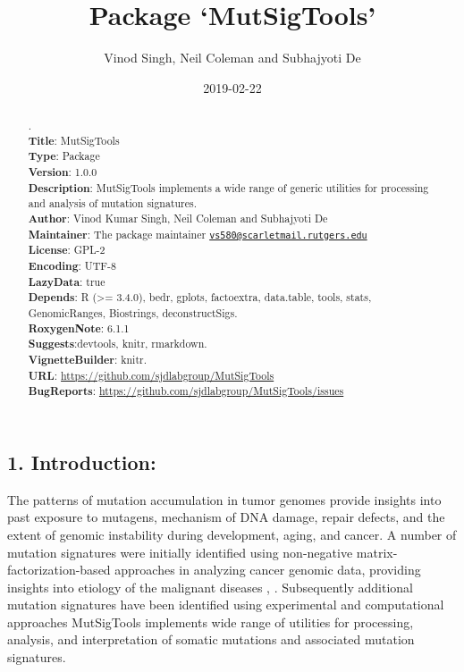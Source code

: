 \documentclass[]{article}
\title{Package `MutSigTools'}
\author{Vinod Singh, Neil Coleman and Subhajyoti De}
\date{2019-02-22}
\begin{document}
\maketitle
\begin{abstract}
.\\
\textbf{Title}: MutSigTools\\
\textbf{Type}: Package\\
\textbf{Version}: 1.0.0\\
\textbf{Description}: MutSigTools implements a wide range of generic
utilities for processing and analysis of mutation signatures.\\
\textbf{Author}: Vinod Kumar Singh, Neil Coleman and Subhajyoti De\\
\textbf{Maintainer}: The package maintainer
\href{mailto:vs580@scarletmail.rutgers.edu}{\nolinkurl{vs580@scarletmail.rutgers.edu}}\\
\textbf{License}: GPL-2\\
\textbf{Encoding}: UTF-8\\
\textbf{LazyData}: true\\
\textbf{Depends}: R (\textgreater{}= 3.4.0), bedr, gplots, factoextra,
data.table, tools, stats, GenomicRanges, Biostrings, deconstructSigs.\\
\textbf{RoxygenNote}: 6.1.1\\
\textbf{Suggests}:devtools, knitr, rmarkdown.\\
\textbf{VignetteBuilder}: knitr.\\
\textbf{URL}: \url{https://github.com/sjdlabgroup/MutSigTools}\\
\textbf{BugReports}: \url{https://github.com/sjdlabgroup/MutSigTools/issues}
\end{abstract}

\newpage

\tableofcontents

\subsection{1. Introduction:}\label{introduction}

The patterns of mutation accumulation in tumor genomes provide insights
into past exposure to mutagens, mechanism of DNA damage, repair defects,
and the extent of genomic instability during development, aging, and
cancer. A number of mutation signatures were initially identified using
non-negative matrix-factorization-based approaches in analyzing cancer
genomic data, providing insights into etiology of the malignant diseases
\citet{alexandrov2013signatures}, \citet{alexandrov2014mutational}.
Subsequently additional mutation signatures have been identified using
experimental and computational approaches \citet{boot2018depth}
MutSigTools implements wide range of utilities for processing, analysis,
and interpretation of somatic mutations and associated mutation
signatures.
\end{document}
